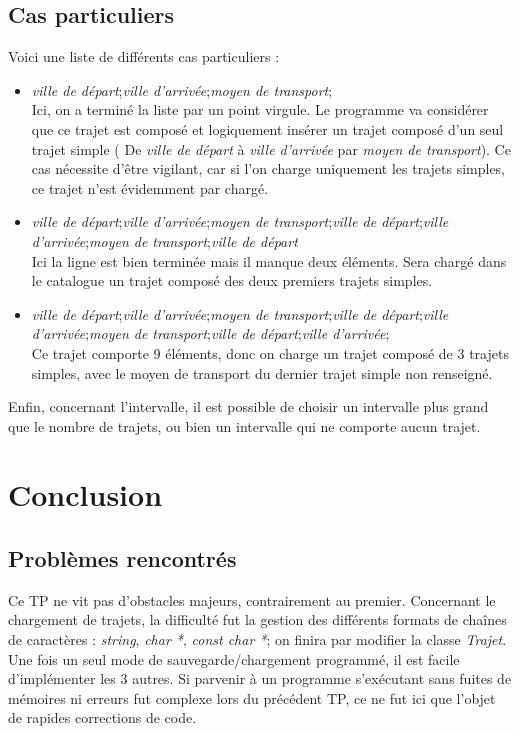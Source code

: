 \documentclass[a4paper]{article}
\begin{document}
\subsection{Cas particuliers}
Voici une liste de différents cas particuliers : 
\begin{itemize}
  \item \textit{ville de départ};\textit{ville d'arrivée};\textit{moyen de transport};\\
  Ici, on a terminé la liste par un point virgule. Le programme va considérer que ce trajet est composé et logiquement insérer un trajet composé d'un seul trajet simple ( De \textit{ville de départ} à \textit{ville d'arrivée} par \textit{moyen de transport}). Ce cas nécessite d'être vigilant, car si l'on charge uniquement les trajets simples, ce trajet n'est évidemment par chargé.
  \item \textit{ville de départ};\textit{ville d'arrivée};\textit{moyen de transport};\textit{ville de départ};\textit{ville d'arrivée};\textit{moyen de transport};\textit{ville de départ} \\
  Ici la ligne est bien terminée mais il manque deux éléments. Sera chargé dans le catalogue un trajet composé des deux premiers trajets simples.
  \item \textit{ville de départ};\textit{ville d'arrivée};\textit{moyen de transport};\textit{ville de départ};\textit{ville d'arrivée};\textit{moyen de transport};\textit{ville de départ};\textit{ville d'arrivée};\\
  Ce trajet comporte 9 éléments, donc on charge un trajet composé de 3 trajets simples, avec le moyen de transport du dernier trajet simple non renseigné.
\end{itemize}  

Enfin, concernant l'intervalle, il est possible de choisir un intervalle plus grand que le nombre de trajets, ou bien un intervalle qui ne comporte aucun trajet.
 
\section{Conclusion}

\subsection{Problèmes rencontrés}

Ce TP ne vit pas d'obstacles majeurs, contrairement au premier. Concernant le chargement de trajets, la difficulté fut la gestion des différents formats de chaînes de caractères : \textit{string}, \textit{char *}, \textit{const char *}; on finira par modifier la classe \textit{Trajet}. Une fois un seul mode de sauvegarde/chargement programmé, il est facile d'implémenter les 3 autres. Si parvenir à un programme s'exécutant sans fuites de mémoires ni erreurs fut complexe lors du précédent TP, ce ne fut ici que l'objet de rapides corrections de code.
\end{document}
